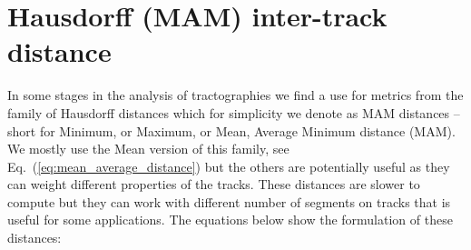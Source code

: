 \documentclass[journal]{IEEEtran}
\begin{document}


\section{Hausdorff (MAM) inter-track distance\label{sec:Hausdorff}}

In some stages in the analysis of tractographies we find a use for
metrics from the family of Hausdorff distances which for simplicity we
denote as MAM distances -- short for Minimum, or Maximum, or Mean,
Average Minimum distance (MAM). We mostly use the Mean version of this
family, see Eq.~(\ref{eq:mean_average_distance}) but the others are
potentially useful as they can weight different properties of the
tracks. These distances are slower to compute but they can work with
different number of segments on tracks that is useful for some
applications. The equations below show the formulation of these
distances:
\end{document}
